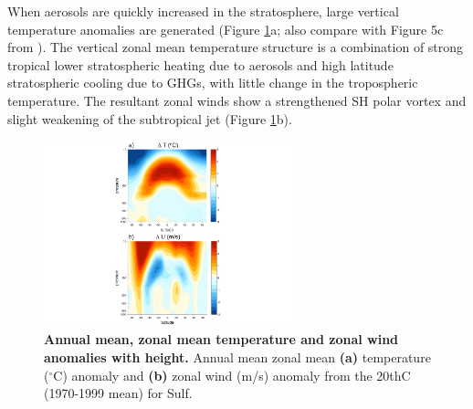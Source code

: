\documentclass[draft,grl]{AGUTeX}  %
\begin{document}
\begin{article}
When aerosols are quickly increased in the stratosphere, large vertical temperature anomalies are generated (Figure \ref{fig:vert}a; also compare with Figure 5c from \citet{mccusker12}). The vertical zonal mean temperature structure is a combination of strong tropical lower stratospheric heating due to aerosols \citep{ferraro11} and high latitude stratospheric cooling due to GHGs, with little change in the tropospheric temperature. The resultant zonal winds show a strengthened SH polar vortex and slight weakening of the subtropical jet (Figure \ref{fig:vert}b). %

\begin{figure}[htbp] %
\centering
 \noindent\includegraphics[width=17pc]{figures/verticalU_T_v20thC2.pdf}  %
\caption{\textbf{Annual mean, zonal mean temperature and zonal wind anomalies with height.} Annual mean zonal mean \textbf{(a)} temperature ($^\circ$C) anomaly and \textbf{(b)} zonal wind (m/s) anomaly from the 20thC (1970-1999 mean) for Sulf.}
\label{fig:vert}
\end{figure}


\end{article}
\end{document}
